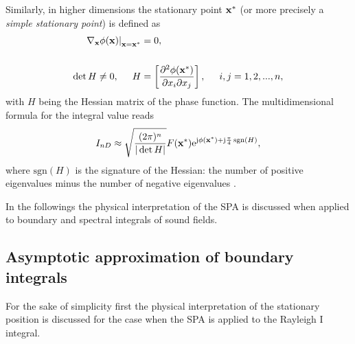 \vspace{3mm}
Similarly, in higher dimensions the stationary point $\mathbf{x}^*$ (or more precisely a \emph{simple stationary point}) is defined as
\begin{align}
\label{Eq:ndim_stat_point}
\begin{split}
\left.
\nabla_{\vx} \phi(\vx)\right|_{\vx = \vx^*} &= 0,
\\ \vspace{3mm} \\
\det H \neq 0,
\hspace{5mm} 
H &= \left[
\frac{\partial^2 \phi(\vx^*)}{\partial x_i \partial x_j} 
\right],
\hspace{5mm}
i,j = 1,2,...,n,
\end{split}
\end{align}
with $H$ being the Hessian matrix of the phase function.
The multidimensional formula for the integral value reads
\begin{equation}
\label{Eq:SPAResult_nd}
I_{nD} \approx \sqrt{\frac{(2\pi)^n}{|\det H|}} F(\mathbf{x}^*) \mathrm{e}^{\mathrm{j} \phi(\mathbf{x}^*) + \mathrm{j} \frac{\pi}{4}\,\mathrm{sgn}\left( H \right)},
\end{equation}
where $\mathrm{sgn}\left( H \right)$ is the signature of the Hessian: the number of positive eigenvalues minus the number of negative eigenvalues \cite{Bleistein2000}.

In the followings the physical interpretation of the SPA is discussed when applied to boundary and spectral integrals of sound fields.

\subsection{Asymptotic approximation of boundary integrals}
\label{Sec:HS_approx:SPA_for_Rayleigh}
For the sake of simplicity first the physical interpretation of the stationary position is discussed for the case when the SPA is applied to the Rayleigh I integral.
%

